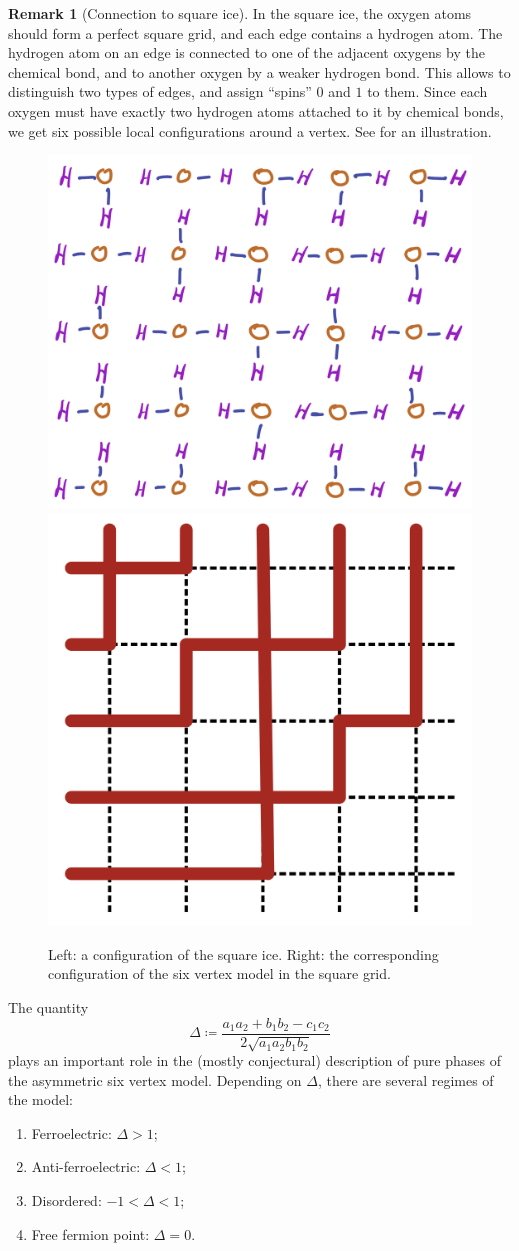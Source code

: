 \documentclass[letterpaper,11pt,oneside,reqno]{article}
\numberwithin{equation}{section}
\theoremstyle{definition}
\newtheorem{remark}[proposition]{Remark}
\theoremstyle{remark}
\begin{document}
\begin{remark}[Connection to square ice]
	\label{rmk:ice}
	In the square ice, the oxygen atoms should 
	form a perfect square grid, and each 
	edge contains a hydrogen atom.
	The hydrogen atom on an edge is connected to one of the adjacent oxygens 
	by the chemical bond, and to another oxygen by a weaker hydrogen
	bond. 
	This allows to distinguish two types of edges, and assign
	``spins'' $0$ and $1$ to them. 
	Since each oxygen must have exactly two hydrogen
	atoms attached to it by chemical bonds, we get 
	six possible local configurations around a vertex. See 
	for an illustration.

	\begin{figure}[htpb]
		\centering
		\includegraphics[width=.3\textwidth]{./images/ice.png}
		\qquad 
		\includegraphics[width=.265\textwidth]{./images/paths.png}
		\caption{Left: a configuration of the square ice. Right:
		the corresponding configuration of the six vertex model in the square grid.}
		\label{fig:ice}
	\end{figure}
\end{remark}

The quantity
\begin{equation}
	\label{eq:delta_6v_general}
	\Delta\coloneqq \frac{a_1a_2+b_1b_2-c_1c_2}{2\sqrt{a_1a_2b_1b_2}}
\end{equation}
plays an important role in the (mostly conjectural) description
of pure phases of the asymmetric six vertex model.
Depending on $\Delta$, there are several regimes of the model:
\begin{enumerate}[$\bullet$]
	\item Ferroelectric: $\Delta>1$;
	\item Anti-ferroelectric: $\Delta<1$;
	\item Disordered: $-1<\Delta<1$;
	\item Free fermion point: $\Delta=0$.
\end{enumerate}
\end{document}

